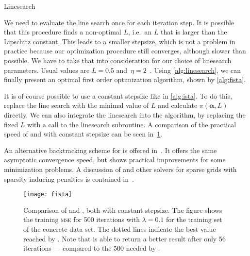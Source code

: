 \begin{algorithm}[h!]
 \caption{Linesearch~\cite{fista}}\label{alg:linesearch}
 \begin{algorithmic}[1]
  \Statex
    \Do
    \State {} 
  \EndFunction
 \end{algorithmic}
\end{algorithm}

We need to evaluate the line search once for each iteration step.
It is possible that this procedure finds a non-optimal \(L\), i.e.~an \(L\) that
is larger than the Lipschitz constant.
This leads to a smaller stepsize, which is not a problem in practice because our optimization procedure still converges, although slower than possible.
We have to take that into consideration for our choice of linesearch parameters.
Usual values are \(L = 0.5\) and~\(\eta = 2\)~\cite{fista-backtracking}.
Using \cref{alg:linesearch}, we can finally present an optimal first order optimization algorithm, shown by \cref{alg:fista}.

It is of course possible to use a constant stepsize like in \cref{alg:ista}.
To do this, replace the line search with the minimal value of \(L\) and
calculate \(\pi(\bm{\alpha}, L)\) directly.
We can also integrate the linesearch into the \ista algorithm, by replacing the
fixed \(L\) with a call to the linesearch subroutine.
A comparison of the practical speed of \ista and \fista with constant stepsize can be seen in~\cref{fig:fista-convergence}.

An alternative backtracking scheme for \fista is offered in~\cite{fista-backtracking}.
It offers the same asymptotic convergence speed, but shows practical improvements for some minimization problems.
A discussion of \fista and other solvers for sparse grids with sparsity-inducing
penalties is contained in~\cite{sparse-parsimony}.

\begin{figure}[bt]
  \texttt{[image: fista]}
  \caption[Comparison of \fista and \ista]{Comparison of \fista and \ista, both with constant stepsize.
    The figure shows the training \textsc{mse} for 500
    iterations with \(\lambda = 0.1\) for the training set of the concrete
    data set.
    The dotted lines indicate the best value reached by \ista.
    Note that \fista is able to return a better result after only 56
    iterations ---
    compared to the 500 needed by \ista.
  }\label{fig:fista-convergence}
\end{figure}

